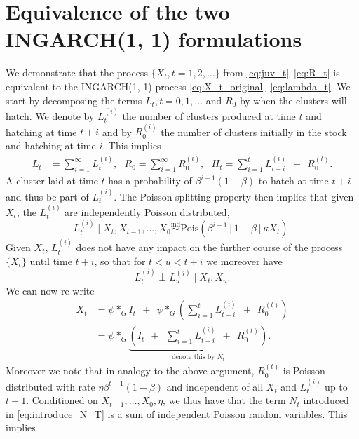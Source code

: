 \documentclass[review]{elsarticle}
\begin{document}
\appendix
\section{Equivalence of the two INGARCH(1, 1) formulations}
\label{appendix:proof}

We demonstrate that the process $\{X_t, t = 1, 2, \dots\}$ from \eqref{eq:juv_t}--\eqref{eq:R_t} is equivalent to the INGARCH(1, 1) process \eqref{eq:X_t_original}--\eqref{eq:lambda_t}. We start by decomposing the terms $L_t, t = 0, 1, \dots$ and $R_0$ by when the clusters will hatch. We denote by $L_t^{(i)}$ the number of clusters produced at time $t$ and hatching at time $t + i$ and by $R^{(i)}_0$ the number of clusters initially in the stock and hatching at time $i$. This implies
\begin{align*}
L_t & = \sum_{i = 1}^\infty L_t^{(i)}, \ \ \ 
R_0 = \sum_{i = 1}^\infty R_0^{(i)}, \ \ \ 
H_t = \sum_{i = 1}^{t} L_{t - i}^{(i)} \ \ + \ \ R_0^{(t)}.
\end{align*}
A cluster laid at time $t$ has a probability of $\beta^{i - 1}(1 - \beta)$ to hatch at time $t + i$ and thus be part of $L_t^{(i)}$. The Poisson splitting property \cite{Kingman1993} then implies that given $X_t$, the $L_t^{(i)}$ are independently Poisson distributed,
$$
L_t^{(i)} \mid X_t, X_{t - 1}, \dots, X_0 \stackrel{\text{ind}}{\sim} \text{Pois}(\beta^{i - 1}[1 - \beta]\kappa X_t). %
$$
Given $X_t$, $L_t^{(i)}$ does not have any impact on the further course of the process $\{X_t\}$ until time $t + i$, so that for $t < u < t + i$ we moreover have
$$
L_t^{(i)} \perp L_u^{(j)} \mid X_t, X_u.
$$
We can now re-write
\begin{align}
X_t & = \psi *_G I_t \ \ + \ \ \psi *_G\left(\sum_{i = 1}^{t} L_{t - i}^{(i)} \ \ + \ \ R_0^{(t)}\right)\nonumber \\
& = \psi *_G \underbrace{\left( I_t \ \ + \ \ \sum_{i = 1}^{t} L_{t - i}^{(i)} \ \ + \ \ R_0^{(t)}\right)}_{\text{denote this by } N_t}. \label{eq:introduce_N_T}
\end{align}
Moreover we note that in analogy to the above argument, $R_0^{(t)}$ is Poisson distributed with rate $\eta\beta^{t - 1}(1 - \beta)$ and independent of all $X_t$ and $L_t^{(i)}$ up to $t - 1$. Conditioned on $X_{t - 1}, \dots, X_0, \eta$, we thus have that the term $N_t$ introduced in \eqref{eq:introduce_N_T} is a sum of independent Poisson random variables. This implies
\end{document}
